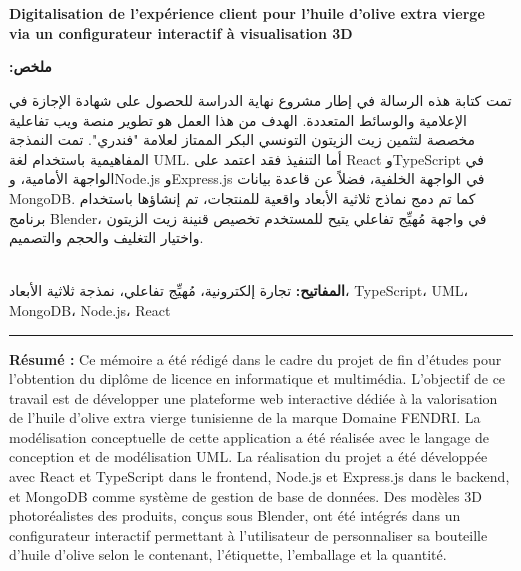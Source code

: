 \chapter*{}
\thispagestyle{empty}

\vspace*{\fill}

\begin{center}
{\large\bfseries\color{marron}
Digitalisation de l'expérience client pour l'huile d'olive extra vierge\\
via un configurateur interactif à visualisation 3D
}\\[0.3cm]
{\normalsize \NomEtudiant}
\end{center}

\vspace{1cm}

\begin{flushright}
\textbf{:ملخص}\\[0.3cm]
\begin{minipage}{0.95\textwidth}
\begin{flushright}
تمت كتابة هذه الرسالة في إطار مشروع نهاية الدراسة للحصول على شهادة الإجازة في الإعلامية والوسائط المتعددة. الهدف من هذا العمل هو تطوير منصة ويب تفاعلية مخصصة لتثمين زيت الزيتون التونسي البكر الممتاز لعلامة "فندري". تمت النمذجة المفاهيمية باستخدام لغة UML. أما التنفيذ فقد اعتمد على React وTypeScript في الواجهة الأمامية، وNode.js وExpress.js في الواجهة الخلفية، فضلاً عن قاعدة بيانات MongoDB. كما تم دمج نماذج ثلاثية الأبعاد واقعية للمنتجات، تم إنشاؤها باستخدام برنامج Blender، في واجهة مُهيِّج تفاعلي يتيح للمستخدم تخصيص قنينة زيت الزيتون واختيار التغليف والحجم والتصميم.
\end{flushright}
\end{minipage}\\[0.3cm]
\textbf{المفاتيح:} تجارة إلكترونية، مُهيِّج تفاعلي، نمذجة ثلاثية الأبعاد، TypeScript، UML، MongoDB، Node.js، React
\end{flushright}

\vspace{0.8cm}
\textcolor{or}{\rule{\textwidth}{0.4pt}}
\vspace{0.8cm}

\noindent\textbf{Résumé :} Ce mémoire a été rédigé dans le cadre du projet de fin d'études pour l'obtention du diplôme de licence en informatique et multimédia. L'objectif de ce travail est de développer une plateforme web interactive dédiée à la valorisation de l'huile d'olive extra vierge tunisienne de la marque Domaine FENDRI. La modélisation conceptuelle de cette application a été réalisée avec le langage de conception et de modélisation UML. La réalisation du projet a été développée avec React et TypeScript dans le frontend, Node.js et Express.js dans le backend, et MongoDB comme système de gestion de base de données. Des modèles 3D photoréalistes des produits, conçus sous Blender, ont été intégrés dans un configurateur interactif permettant à l'utilisateur de personnaliser sa bouteille d'huile d'olive selon le contenant, l'étiquette, l'emballage et la quantité.

